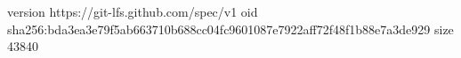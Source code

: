 version https://git-lfs.github.com/spec/v1
oid sha256:bda3ea3e79f5ab663710b688cc04fc9601087e7922aff72f48f1b88e7a3de929
size 43840
